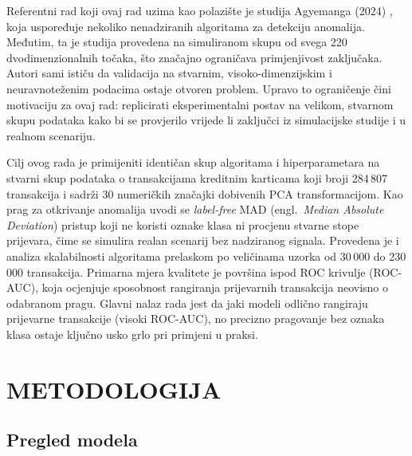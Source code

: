 \documentclass[letterpaper, 10pt, conference]{ieeeconf}
\begin{document}
Referentni rad koji ovaj rad uzima kao polazište je studija Agyemanga (2024) \cite{agyemang}, koja uspoređuje nekoliko nenadziranih algoritama za detekciju anomalija. Međutim, ta je studija provedena na simuliranom skupu od svega 220 dvodimenzionalnih točaka, što značajno ograničava primjenjivost zaključaka. Autori sami ističu da validacija na stvarnim, visoko-dimenzijskim i neuravnoteženim podacima ostaje otvoren problem. Upravo to ograničenje čini motivaciju za ovaj rad: replicirati eksperimentalni postav na velikom, stvarnom skupu podataka kako bi se provjerilo vrijede li zaključci iz simulacijske studije i u realnom scenariju.

Cilj ovog rada je primijeniti identičan skup algoritama i hiperparametara na stvarni skup podataka o transakcijama kreditnim karticama \cite{kaggle} koji broji 284\,807 transakcija i sadrži 30 numeričkih značajki dobivenih PCA transformacijom. Kao prag za otkrivanje anomalija uvodi se \emph{label-free} MAD (engl.\ \emph{Median Absolute Deviation}) pristup koji ne koristi oznake klasa ni procjenu stvarne stope prijevara, čime se simulira realan scenarij bez nadziranog signala. Provedena je i analiza skalabilnosti algoritama prelaskom po veličinama uzorka od 30\,000 do 230\,000 transakcija. Primarna mjera kvalitete je površina ispod ROC krivulje (ROC-AUC), koja ocjenjuje sposobnost rangiranja prijevarnih transakcija neovisno o odabranom pragu. Glavni nalaz rada jest da jaki modeli odlično rangiraju prijevarne transakcije (visoki ROC-AUC), no precizno pragovanje bez oznaka klasa ostaje ključno usko grlo pri primjeni u praksi.

\section{\textbf{METODOLOGIJA}}
\subsection{Pregled modela}
\end{document}
